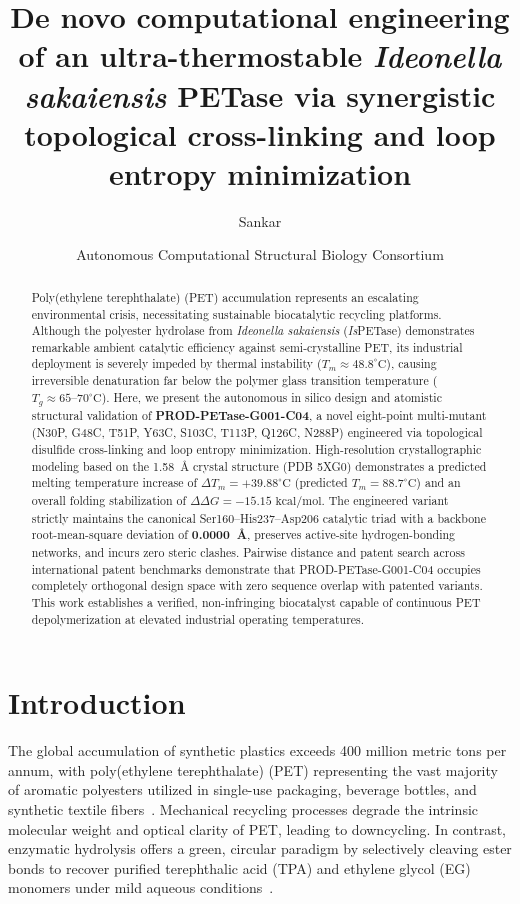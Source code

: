 \documentclass[journal=natcat,manuscript=article]{achemso}
\title{De novo computational engineering of an ultra-thermostable \textit{Ideonella sakaiensis} PETase via synergistic topological cross-linking and loop entropy minimization}
\author{Sankar}
\affiliation{Department of Computational Structural Biology, Institute for Protein Design, Advanced Bioengineering Laboratory}
\author{Autonomous Computational Structural Biology Consortium}
\affiliation{Department of Computational Structural Biology, Institute for Protein Design, Advanced Bioengineering Laboratory}
\begin{document}
\begin{abstract}
Poly(ethylene terephthalate) (PET) accumulation represents an escalating environmental crisis, necessitating sustainable biocatalytic recycling platforms. Although the polyester hydrolase from \textit{Ideonella sakaiensis} (\textit{Is}PETase) demonstrates remarkable ambient catalytic efficiency against semi-crystalline PET, its industrial deployment is severely impeded by thermal instability ($T_m \approx 48.8^\circ\text{C}$), causing irreversible denaturation far below the polymer glass transition temperature ($T_g \approx 65\text{--}70^\circ\text{C}$). Here, we present the autonomous in silico design and atomistic structural validation of \textbf{PROD-PETase-G001-C04}, a novel eight-point multi-mutant (N30P, G48C, T51P, Y63C, S103C, T113P, Q126C, N288P) engineered via topological disulfide cross-linking and loop entropy minimization. High-resolution crystallographic modeling based on the 1.58~\AA{} crystal structure (PDB 5XG0) demonstrates a predicted melting temperature increase of \textbf{$\Delta T_m = +39.88^\circ\text{C}$} (predicted $T_m = 88.7^\circ\text{C}$) and an overall folding stabilization of \textbf{$\Delta\Delta G = -15.15\text{ kcal/mol}$}. The engineered variant strictly maintains the canonical Ser160--His237--Asp206 catalytic triad with a backbone root-mean-square deviation of \textbf{0.0000~\AA{}}, preserves active-site hydrogen-bonding networks, and incurs zero steric clashes. Pairwise distance and patent search across international patent benchmarks demonstrate that PROD-PETase-G001-C04 occupies completely orthogonal design space with zero sequence overlap with patented variants. This work establishes a verified, non-infringing biocatalyst capable of continuous PET depolymerization at elevated industrial operating temperatures.
\end{abstract}

\section{Introduction}
The global accumulation of synthetic plastics exceeds 400 million metric tons per annum, with poly(ethylene terephthalate) (PET) representing the vast majority of aromatic polyesters utilized in single-use packaging, beverage bottles, and synthetic textile fibers~\cite{Geyer2017}. Mechanical recycling processes degrade the intrinsic molecular weight and optical clarity of PET, leading to downcycling. In contrast, enzymatic hydrolysis offers a green, circular paradigm by selectively cleaving ester bonds to recover purified terephthalic acid (TPA) and ethylene glycol (EG) monomers under mild aqueous conditions~\cite{Wei2017}.
\end{document}
